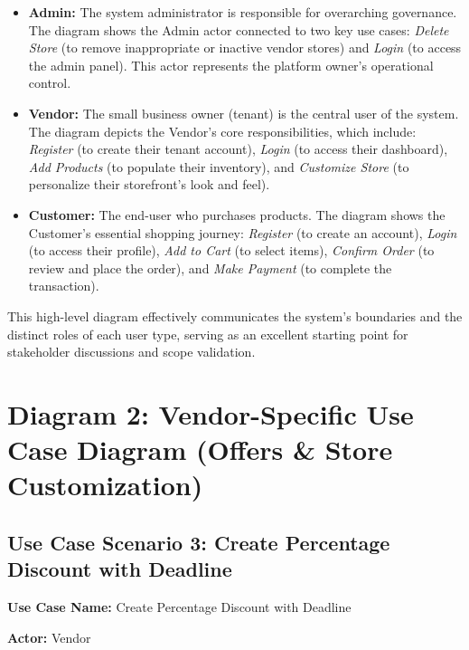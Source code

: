 \begin{itemize}
    \item \textbf{Admin:} The system administrator is responsible for overarching governance. The diagram shows the Admin actor connected to two key use cases: \textit{Delete Store} (to remove inappropriate or inactive vendor stores) and \textit{Login} (to access the admin panel). This actor represents the platform owner's operational control.
    
    \item \textbf{Vendor:} The small business owner (tenant) is the central user of the system. The diagram depicts the Vendor's core responsibilities, which include: \textit{Register} (to create their tenant account), \textit{Login} (to access their dashboard), \textit{Add Products} (to populate their inventory), and \textit{Customize Store} (to personalize their storefront's look and feel).
    
    \item \textbf{Customer:} The end-user who purchases products. The diagram shows the Customer's essential shopping journey: \textit{Register} (to create an account), \textit{Login} (to access their profile), \textit{Add to Cart} (to select items), \textit{Confirm Order} (to review and place the order), and \textit{Make Payment} (to complete the transaction).
\end{itemize}

This high-level diagram effectively communicates the system's boundaries and the distinct roles of each user type, serving as an excellent starting point for stakeholder discussions and scope validation.

\section{Diagram 2: Vendor-Specific Use Case Diagram (Offers \& Store Customization)}

\subsection{Use Case Scenario 3: Create Percentage Discount with Deadline}

\textbf{Use Case Name:} Create Percentage Discount with Deadline

\textbf{Actor:} Vendor

